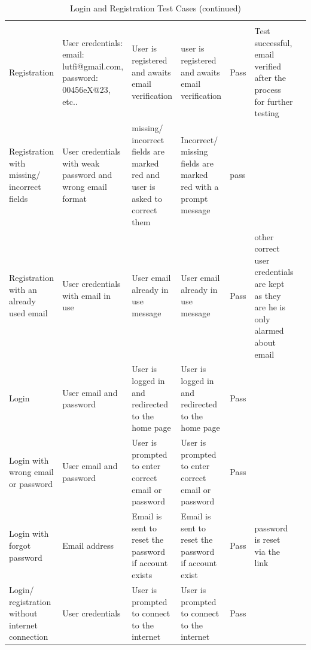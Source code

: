 \documentclass[a4paper, 12pt]{report} %
\begin{document}
\begin{spacing}{1}
\begin{longtable}{| R{2cm}|R{3cm}|R{2cm}|R{2cm}|R{2cm}|R{2cm}|R{2cm}|}
                        \endfoot
                        \caption*{Login and Registration Test Cases (continued)}\\
                        \endlastfoot
                        \hline
                        Registration & User credentials: email: lutfi@gmail.com, password: 00456eX@23, etc.. & User is registered and awaits email verification & user is registered and awaits email verification & Pass & Test successful, email verified after the process for further testing\\ 
                        \hline
                        Registration with missing/ incorrect fields & User credentials with weak password and wrong email format & missing/ incorrect fields are marked red and user is asked to correct them & Incorrect/ missing fields are marked red with a prompt message & pass & \\
                        \hline
                        Registration with an already used email & User credentials with email in use & \raggedright{User email already in use message} & User email already in use message& Pass & other correct user credentials are kept as they are he is only alarmed about email\\
                        \hline
                        Login & User email and password & User is logged in and redirected to the home page & User is logged in and redirected to the home page & Pass & \\
                        \hline
                        Login with wrong email or password & User email and password & User is prompted to enter correct email or password & User is prompted to enter correct email or password & Pass & \\
                        \hline
                        Login with forgot password & Email address & Email is sent to reset the password if account exists& Email is sent to reset the password if account exist &Pass & password is reset via the link\\
                        \hline
                        Login/ registration without internet connection & User credentials & User is prompted to connect to the internet & User is prompted to connect to the internet & Pass & \\
                        \hline
                    \end{longtable}
                \end{spacing}
                
\end{document}
